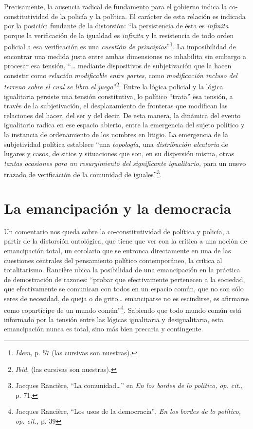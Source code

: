 Precisamente, la ausencia radical de fundamento para el gobierno indica la co-constitutividad de la policía y la política. El carácter de esta relación es indicada por la posición fundante de la distorsión: \enquote{la persistencia de ésta es \emph{infinita} porque la verificación de la igualdad es \emph{infinita} y la resistencia de todo orden policial a esa verificación es una \emph{cuestión de principios}}\footnote{\emph{Idem,} p. 57 (las cursivas son nuestras).}. La imposibilidad de encontrar una medida justa entre ambas dimensiones no inhabilita sin embargo a procesar esa tensión, \enquote{\ldots{} mediante dispositivos de subjetivación que la hacen consistir como \emph{relación modificable entre partes,} como \emph{modificación incluso del terreno sobre el cual se libra el juego}}\footnote{\emph{Ibid.} (las cursivas son nuestras).}. Entre la lógica policial y la lógica igualitaria persiste una tensión constitutiva, lo político \enquote{trata} esa tensión, a través de la subjetivación, el desplazamiento de fronteras que modifican las relaciones del hacer, del ser y del decir. De esta manera, la dinámica del evento igualitario radica en ese espacio abierto, entre la emergencia del sujeto político y la instancia de ordenamiento de los nombres en litigio. La emergencia de la subjetividad política establece \enquote{una \emph{topología,} una \emph{distribución aleatoria} de lugares y casos, de sitios y situaciones que son, en su dispersión misma, otras \emph{tantas ocasiones para un resurgimiento del significante igualitario,} para un nuevo trazado de verificación de la comunidad de iguales}\footnote{Jacques Rancière, \enquote{La comunidad\ldots} en \emph{En los bordes de lo político,} \emph{op. cit.,} p. 71.}.

\section{La emancipación y la democracia}

Un comentario nos queda sobre la co-constitutividad de política y policía, a partir de la distorsión ontológica, que tiene que ver con la crítica a una noción de emancipación total, un corolario que se entronca directamente en una de las cuestiones centrales del pensamiento político contemporáneo, la crítica al totalitarismo. Rancière ubica la posibilidad de una emancipación en la práctica de demostración de razones: \enquote{probar que efectivamente pertenecen a la sociedad, que efectivamente se comunican con todos en un espacio común, que no son sólo seres de necesidad, de queja o de grito\ldots{} emanciparse no es escindirse, es afirmarse como copartícipe de un mundo común}\footnote{Jacques Rancière, \enquote{Los usos de la democracia}, \emph{En los bordes de lo político,} \emph{op. cit.,} p. 39}. Sabiendo que todo mundo común está informado por la tensión entre las lógicas igualitaria y desigualitaria, esta emancipación nunca es total, sino más bien precaria y contingente.

